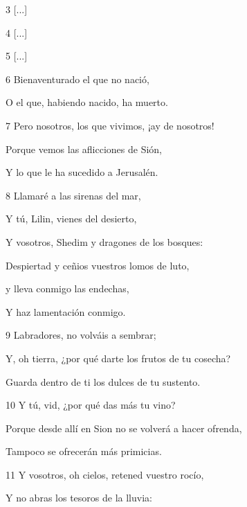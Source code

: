 \par 3 [...]

\par 4 [...]

\par 5 [...]

\par 6 Bienaventurado el que no nació,

\par O el que, habiendo nacido, ha muerto.

\par 7 Pero nosotros, los que vivimos, ¡ay de nosotros!

\par Porque vemos las aflicciones de Sión,

\par Y lo que le ha sucedido a Jerusalén.

\par 8 Llamaré a las sirenas del mar,

\par Y tú, Lilin, vienes del desierto,

\par Y vosotros, Shedim y dragones de los bosques:

\par Despiertad y ceñios vuestros lomos de luto,

\par y lleva conmigo las endechas,

\par Y haz lamentación conmigo.

\par 9 Labradores, no volváis a sembrar;

\par Y, oh tierra, ¿por qué darte los frutos de tu cosecha?

\par Guarda dentro de ti los dulces de tu sustento.

\par 10 Y tú, vid, ¿por qué das más tu vino?

\par Porque desde allí en Sion no se volverá a hacer ofrenda,

\par Tampoco se ofrecerán más primicias.

\par 11 Y vosotros, oh cielos, retened vuestro rocío,

\par Y no abras los tesoros de la lluvia:

